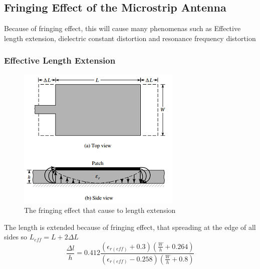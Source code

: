 \documentclass[11pt,a4paper]{article}
\begin{document}
  \newpage

  \subsection{Fringing Effect of the Microstrip Antenna}
    \indent Because of fringing effect, this will cause many phenomenas such as Effective length extension, 
            dielectric constant distortion and resonance frequency distortion\cite{CoB:05}
    
    \subsubsection{Effective Length Extension}
      \begin{figure}[ht]
        \includegraphics{fringingeffect.png}
        \centering
        \caption{The fringing effect that cause to length extension}
      \end{figure}
      \indent The length is extended because of fringing effect, that spreading at the edge of all sides so
              $L_{eff} = L + 2\Delta L$\cite{CoB:05} 
      \begin{equation}
        \frac{\Delta l}{h}=0.412\frac{(\epsilon_{r(eff)}+0.3)(\frac{W}{h} + 0.264)}{(\epsilon_{r(eff)}-0.258)(\frac{W}{h} + 0.8)}
      \end{equation}
\end{document}
